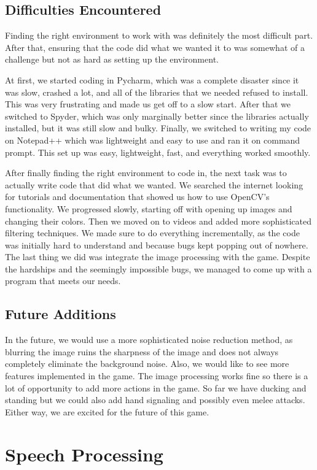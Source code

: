 \documentclass[titlepage, 12pt]{scrartcl}
\begin{document}
    \subsection{Difficulties Encountered}
    Finding the right environment to work with was definitely the most difficult part. After that, ensuring that the code did what we wanted it to was somewhat of a challenge but not as hard as setting up the environment. \par
    At first, we started coding in Pycharm, which was a complete disaster since it was slow, crashed a lot, and all of the libraries that we needed refused to install. This was very frustrating and made us get off to a slow start. After that we switched to Spyder, which was only marginally better since the libraries actually installed, but it was still slow and bulky. Finally, we switched to writing my code on Notepad++ which was lightweight and easy to use and ran it on command prompt. This set up was easy, lightweight, fast, and everything worked smoothly.\par
    After finally finding the right environment to code in, the next task was to actually write code that did what we wanted. We searched the internet looking for tutorials and documentation that showed us how to use OpenCV's functionality. We progressed slowly, starting off with opening up images and changing their colors. Then we moved on to videos and added more sophisticated filtering techniques. We made sure to do everything incrementally, as the code was initially hard to understand and because bugs kept popping out of nowhere. The last thing we did was integrate the image processing with the game. Despite the hardships and the seemingly impossible bugs, we managed to come up with a program that meets our needs. 
    \subsection{Future Additions}
    In the future, we would use a more sophisticated noise reduction method, as blurring the image ruins the sharpness of the image and does not always completely eliminate the background noise. Also, we would like to see more features implemented in the game. The image processing works fine so there is a lot of opportunity to add more actions in the game. So far we have ducking and standing but we could also add hand signaling and possibly even melee attacks. Either way, we are excited for the future of this game.
    
\section{Speech Processing}
\end{document}
